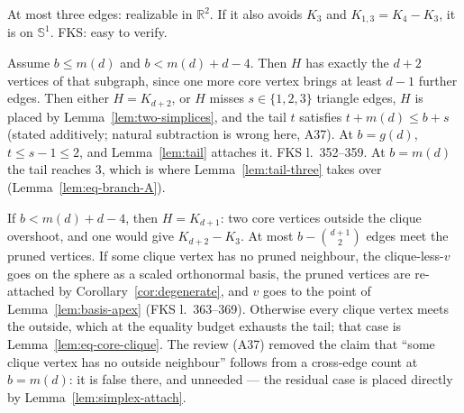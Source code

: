 \begin{lemma}[$S(2)$]
  \label{lem:S2}
  \leanok
  At most three edges: realizable in $\mathbb{R}^2$. If it also avoids $K_3$ and
  $K_{1,3} = K_4 - K_3$, it is on $\mathbb{S}^1$. FKS: easy to verify.
\end{lemma}

\begin{lemma}
  \label{lem:branch-A}
  \leanok
  Assume $b \le m(d)$ and $b < m(d) + d - 4$. Then $H$ has exactly the $d + 2$ vertices of
  that subgraph, since one more core vertex brings at least $d - 1$ further edges. Then
  either $H = K_{d+2}$, or $H$ misses $s \in \{1, 2, 3\}$ triangle edges, $H$ is placed by
  Lemma~\ref{lem:two-simplices}, and the tail $t$ satisfies $t + m(d) \le b + s$ (stated
  additively; natural subtraction is wrong here, A37). At $b = g(d)$, $t \le s - 1 \le 2$,
  and Lemma~\ref{lem:tail} attaches it. FKS l.~352--359. At $b = m(d)$ the tail reaches
  $3$, which is where Lemma~\ref{lem:tail-three} takes over
  (Lemma~\ref{lem:eq-branch-A}).
\end{lemma}

\begin{lemma}
  \label{lem:branch-B}
  \leanok
  If $b < m(d) + d - 4$, then $H = K_{d+1}$: two core vertices outside the clique overshoot,
  and one would give $K_{d+2} - K_3$. At most $b - \binom{d+1}{2}$ edges meet the pruned
  vertices. If some clique vertex has no pruned neighbour, the clique-less-$v$ goes on the
  sphere as a scaled orthonormal basis, the pruned vertices are re-attached by
  Corollary~\ref{cor:degenerate}, and $v$ goes to the point of Lemma~\ref{lem:basis-apex}
  (FKS l.~363--369). Otherwise every clique vertex meets the outside, which at the equality
  budget exhausts the tail; that case is Lemma~\ref{lem:eq-core-clique}. The review (A37)
  removed the claim that ``some clique vertex has no outside neighbour'' follows from a
  cross-edge count at $b = m(d)$: it is false there, and unneeded --- the residual case is
  placed directly by Lemma~\ref{lem:simplex-attach}.
\end{lemma}

